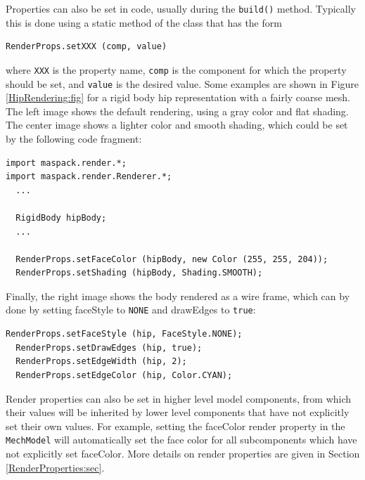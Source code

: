 Properties can also be set in code, usually during the {\tt build()}
method. Typically this is done using a static method of the
 class that has the form
%
\begin{lstlisting}[]
  RenderProps.setXXX (comp, value)
\end{lstlisting}
%
where {\tt XXX} is the property name, {\tt comp} is the component for
which the property should be set, and {\tt value} is the desired
value. Some examples are shown in Figure \ref{HipRendering:fig} for a
rigid body hip representation with a fairly coarse mesh.  The
left image shows the default rendering, using a gray color and flat
shading. The center image shows a lighter color and smooth shading,
which could be set by the following code fragment:
%
\begin{lstlisting}[]
import maspack.render.*;
import maspack.render.Renderer.*;
  ...

  RigidBody hipBody;
  ...

  RenderProps.setFaceColor (hipBody, new Color (255, 255, 204));
  RenderProps.setShading (hipBody, Shading.SMOOTH);
\end{lstlisting}
%
Finally, the right image shows the body rendered as a wire
frame, which can by done by setting {\sf faceStyle} to {\tt NONE}
and {\sf drawEdges} to {\tt true}:
\begin{lstlisting}[]
  RenderProps.setFaceStyle (hip, FaceStyle.NONE);
  RenderProps.setDrawEdges (hip, true);
  RenderProps.setEdgeWidth (hip, 2);
  RenderProps.setEdgeColor (hip, Color.CYAN);
\end{lstlisting}
%

Render properties can also be set in higher level model components,
from which their values will be inherited by lower level components
that have not explicitly set their own values. For example, setting
the {\sf faceColor} render property in the {\tt MechModel} will
automatically set the face color for all subcomponents which have not
explicitly set {\sf faceColor}. More details on render properties are
given in Section \ref{RenderProperties:sec}.


